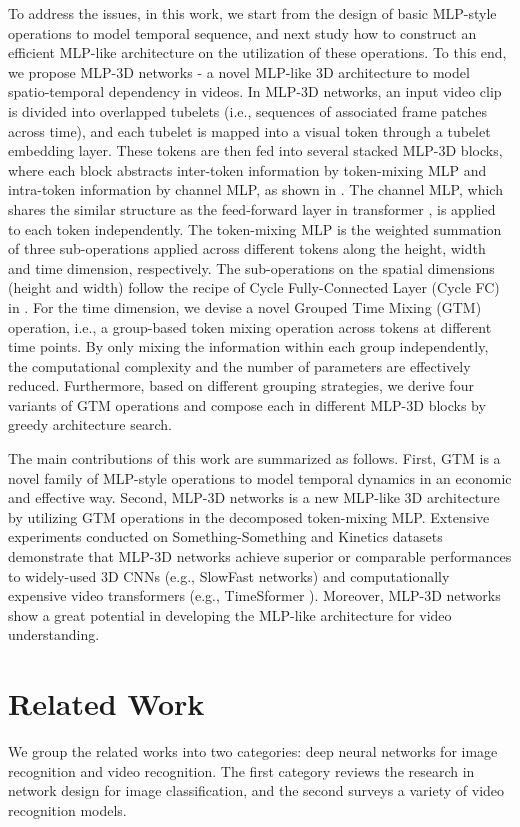 \documentclass[10pt,twocolumn,letterpaper]{article}
\begin{document}
To address the issues, in this work, we start from the design of basic MLP-style operations to model temporal sequence, and next study how to construct an efficient MLP-like architecture on the utilization of these operations. To this end, we propose MLP-3D networks - a novel MLP-like 3D architecture to model spatio-temporal dependency in videos. In MLP-3D networks, an input video clip is divided into overlapped tubelets (i.e., sequences of associated frame patches across time), and each tubelet is mapped into a visual token through a tubelet embedding layer. These tokens are then fed into several stacked MLP-3D blocks, where each block abstracts inter-token information by token-mixing MLP and intra-token information by channel MLP, as shown in . The channel MLP, which shares the similar structure as the feed-forward layer in transformer \cite{vaswani2017attention}, is applied to each token independently. The token-mixing MLP is the weighted summation of three sub-operations applied across different tokens along the height, width and time dimension, respectively. The sub-operations on the spatial dimensions (height and width) follow the recipe of Cycle Fully-Connected Layer (Cycle FC) in \cite{chen2021cyclemlp}. For the time dimension, we devise a novel Grouped Time Mixing (GTM) operation, i.e., a group-based token mixing operation across tokens at different time points. By only mixing the information within each group independently, the computational complexity and the number of parameters are effectively reduced. Furthermore, based on different grouping strategies, we derive four variants of GTM operations and compose each in different MLP-3D blocks by greedy architecture search.

The main contributions of this work are summarized as follows. First, GTM is a novel family of MLP-style operations to model temporal dynamics in an economic and effective way. Second, MLP-3D networks is a new MLP-like 3D architecture by utilizing GTM operations in the decomposed token-mixing MLP. Extensive experiments conducted on Something-Something and Kinetics datasets demonstrate that MLP-3D networks achieve superior or comparable performances to widely-used 3D CNNs (e.g., SlowFast networks\cite{feichtenhofer2019slowfast}) and computationally expensive video transformers (e.g., TimeSformer \cite{bertasius2021space}). Moreover, MLP-3D networks show a great potential in developing the MLP-like architecture for video understanding.

\section{Related Work}
We group the related works into two categories: deep neural networks for image recognition and video recognition. The first category reviews the research in network design for image classification, and the second surveys a variety of video recognition models.
\end{document}
